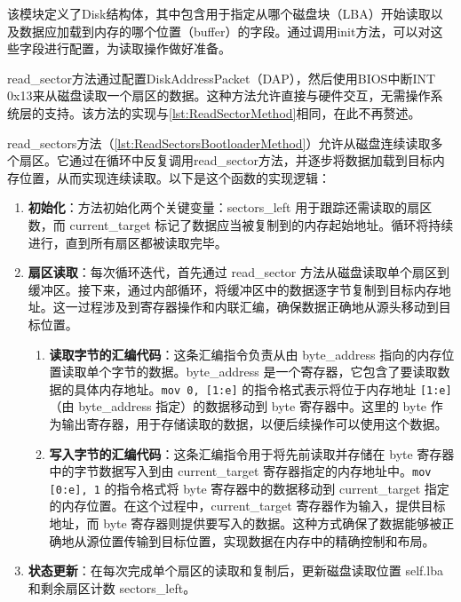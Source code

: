 该模块定义了Disk结构体，其中包含用于指定从哪个磁盘块（LBA）开始读取以及数据应加载到内存的哪个位置（buffer）的字段。通过调用init方法，可以对这些字段进行配置，为读取操作做好准备。

read\_sector方法通过配置DiskAddressPacket（DAP），然后使用BIOS中断INT 0x13来从磁盘读取一个扇区的数据。这种方法允许直接与硬件交互，无需操作系统层的支持。该方法的实现与\cref{lst:ReadSectorMethod}相同，在此不再赘述。

read\_sectors方法（\cref{lst:ReadSectorsBootloaderMethod}）允许从磁盘连续读取多个扇区。它通过在循环中反复调用read\_sector方法，并逐步将数据加载到目标内存位置，从而实现连续读取。以下是这个函数的实现逻辑：

\begin{enumerate}
    \item \textbf{初始化}：方法初始化两个关键变量：sectors\_left 用于跟踪还需读取的扇区数，而 current\_target 标记了数据应当被复制到的内存起始地址。循环将持续进行，直到所有扇区都被读取完毕。
    \item \textbf{扇区读取}：每次循环迭代，首先通过 read\_sector 方法从磁盘读取单个扇区到缓冲区。接下来，通过内部循环，将缓冲区中的数据逐字节复制到目标内存地址。这一过程涉及到寄存器操作和内联汇编，确保数据正确地从源头移动到目标位置。
          \begin{enumerate}
              \item \textbf{读取字节的汇编代码}：这条汇编指令负责从由 byte\_address 指向的内存位置读取单个字节的数据。byte\_address 是一个寄存器，它包含了要读取数据的具体内存地址。\texttt{mov {0}, [{1:e}]} 的指令格式表示将位于内存地址 \texttt{[{1:e}]}（由 byte\_address 指定）的数据移动到 byte 寄存器中。这里的 byte 作为输出寄存器，用于存储读取的数据，以便后续操作可以使用这个数据。
              \item \textbf{写入字节的汇编代码}：这条汇编指令用于将先前读取并存储在 byte 寄存器中的字节数据写入到由 current\_target 寄存器指定的内存地址中。\texttt{mov [{0:e}], {1}} 的指令格式将 byte 寄存器中的数据移动到 current\_target 指定的内存位置。在这个过程中，current\_target 寄存器作为输入，提供目标地址，而 byte 寄存器则提供要写入的数据。这种方式确保了数据能够被正确地从源位置传输到目标位置，实现数据在内存中的精确控制和布局。
          \end{enumerate}
    \item \textbf{状态更新}：在每次完成单个扇区的读取和复制后，更新磁盘读取位置 self.lba 和剩余扇区计数 sectors\_left。
\end{enumerate}

